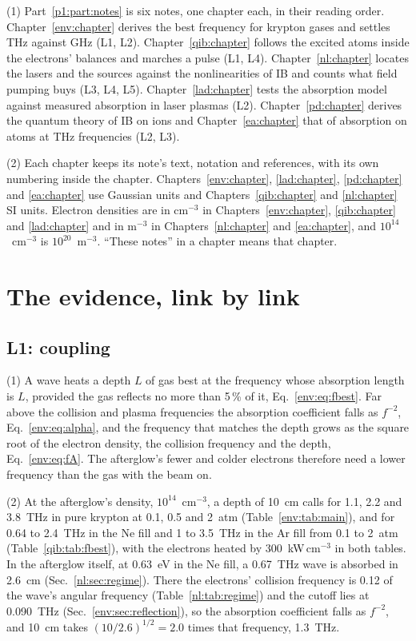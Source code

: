 {\noindent}(1) Part~\ref{p1:part:notes} is six notes, one chapter each, in their
reading order. Chapter~\ref{env:chapter} derives the best frequency for krypton gases
and settles THz against GHz (L1, L2). Chapter~\ref{qib:chapter} follows the excited
atoms inside the electrons' balances and marches a pulse (L1, L4).
Chapter~\ref{nl:chapter} locates the lasers and the sources against the
nonlinearities of IB and counts what field pumping buys (L3, L4, L5).
Chapter~\ref{lad:chapter} tests the absorption model against measured absorption in
laser plasmas (L2). Chapter~\ref{pd:chapter} derives the quantum theory of IB on ions
and Chapter~\ref{ea:chapter} that of absorption on atoms at THz frequencies (L2, L3).

{\noindent}(2) Each chapter keeps its note's text, notation and references, with its
own numbering inside the chapter. Chapters~\ref{env:chapter}, \ref{lad:chapter},
\ref{pd:chapter} and \ref{ea:chapter} use Gaussian units and Chapters~\ref{qib:chapter}
and \ref{nl:chapter} SI units. Electron densities are in cm$^{-3}$ in
Chapters~\ref{env:chapter}, \ref{qib:chapter} and \ref{lad:chapter} and in m$^{-3}$ in
Chapters~\ref{nl:chapter} and \ref{ea:chapter}, and $10^{14}$~cm$^{-3}$ is
$10^{20}$~m$^{-3}$. ``These notes'' in a chapter means that chapter.


\chapter{The evidence, link by link}
\label{p1:chap:evidence}

\section{L1: coupling}
\label{p1:sec:L1}

{\noindent}(1) A wave heats a depth $L$ of gas best at the frequency whose absorption
length is $L$, provided the gas reflects no more than 5\,\% of it,
Eq.~\eqref{env:eq:fbest}. Far above the collision and plasma frequencies the
absorption coefficient falls as $f^{-2}$, Eq.~\eqref{env:eq:alpha}, and the frequency
that matches the depth grows as the square root of the electron density, the
collision frequency and the depth, Eq.~\eqref{env:eq:fA}. The afterglow's fewer and
colder electrons therefore need a lower frequency than the gas with the beam on.

{\noindent}(2) At the afterglow's density, $10^{14}$~cm$^{-3}$, a depth of 10~cm calls
for 1.1, 2.2 and 3.8~THz in pure krypton at 0.1, 0.5 and 2~atm
(Table~\ref{env:tab:main}), and for 0.64 to 2.4~THz in the Ne fill and 1 to 3.5~THz in
the Ar fill from 0.1 to 2~atm (Table~\ref{qib:tab:fbest}), with the electrons heated by
300~kW\,cm$^{-3}$ in both tables. In the afterglow itself, at 0.63~eV in the Ne fill, a
0.67~THz wave is absorbed in 2.6~cm (Sec.~\ref{nl:sec:regime}). There the electrons'
collision frequency is 0.12 of the wave's angular frequency (Table~\ref{nl:tab:regime})
and the cutoff lies at 0.090~THz (Sec.~\ref{env:sec:reflection}), so the absorption
coefficient falls as $f^{-2}$, and 10~cm takes $(10/2.6)^{1/2}=2.0$ times that
frequency, 1.3~THz.

